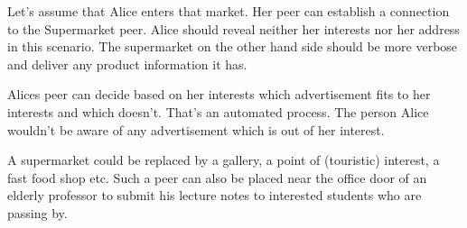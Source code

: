 Let's assume that Alice enters that market. Her peer can establish a connection to the Supermarket peer. Alice should reveal neither her interests nor her address in this scenario. The supermarket on the other hand side should be more verbose and deliver any product information it has.

Alices peer can decide based on her interests which advertisement fits to her interests and which doesn't. That's an automated process. The person Alice wouldn't be aware of any advertisement which is out of her interest.

A supermarket could be replaced by a gallery, a point of (touristic) interest, a fast food shop etc. Such a peer can also be placed near the office door of an elderly professor to submit his lecture notes to interested students who are passing by.
